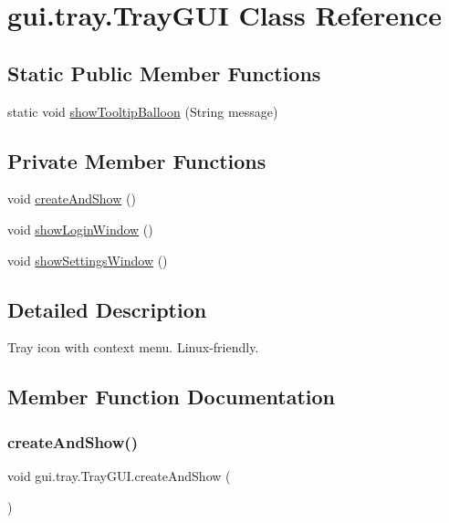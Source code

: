 \hypertarget{classgui_1_1tray_1_1_tray_g_u_i}{}\section{gui.\+tray.\+Tray\+G\+UI Class Reference}
\label{classgui_1_1tray_1_1_tray_g_u_i}
\subsection*{Static Public Member Functions}
\begin{DoxyCompactItemize}
\item 
static void \hyperlink{classgui_1_1tray_1_1_tray_g_u_i_a5a62ab90d4e3f77cd94fed5e1c86946a}{show\+Tooltip\+Balloon} (String message)
\end{DoxyCompactItemize}
\subsection*{Private Member Functions}
\begin{DoxyCompactItemize}
\item 
void \hyperlink{classgui_1_1tray_1_1_tray_g_u_i_a5153077fbc62ee8fae0d76c87203cadd}{create\+And\+Show} ()
\item 
void \hyperlink{classgui_1_1tray_1_1_tray_g_u_i_a763cc454a191cdf02200345893baac01}{show\+Login\+Window} ()
\item 
void \hyperlink{classgui_1_1tray_1_1_tray_g_u_i_a8c69ca5a54c708d065a0172f3cc0e2c5}{show\+Settings\+Window} ()
\end{DoxyCompactItemize}


\subsection{Detailed Description}
Tray icon with context menu. Linux-\/friendly. 

\subsection{Member Function Documentation}
\mbox{\label{classgui_1_1tray_1_1_tray_g_u_i_a5153077fbc62ee8fae0d76c87203cadd}} 
\subsubsection{\texorpdfstring{create\+And\+Show()}{createAndShow()}}
{\footnotesize\ttfamily void gui.\+tray.\+Tray\+G\+U\+I.\+create\+And\+Show (\begin{DoxyParamCaption}{ }\end{DoxyParamCaption})\hspace{0.3cm}{\ttfamily [private]}}

